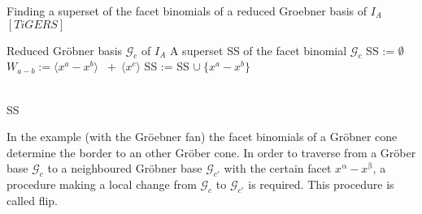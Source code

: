 \begin{algorithm}
\caption{Finding a superset of the facet binomials
of a reduced Groebner basis of $I_A$ $\left[ TiGERS\right]  $}
\label{alg:facetSS}
\begin{algorithmic}[1]

\Require
Reduced Gröbner basis $ \mathcal{G}_{c} $ of $I_A$
\Ensure A superset SS of the facet binomial $\mathcal{G}_{c}$
\State SS := $\emptyset$
\State $W_{a - b} := \langle x^{a}-x^{b}\rangle$
$~+~ \langle x^{c} \rangle$ 
\State SS := SS $\cup~ \{x^{a}-x^{b} \}$

\EndIf
\EndFor \\
\Return SS

\end{algorithmic}
\end{algorithm}
 





 



In the example (with the Gröebner fan) the facet binomials of a Gröbner cone determine the border to an other Gröber cone.
In order to traverse from a Gröber base $\mathcal{G}_c$ to a neighboured Gröbner base $\mathcal{G}_{c'}$ with the certain facet $x^{\upalpha}-x^{\upbeta} $, a procedure making a local change from $\mathcal{G}_c$ to $\mathcal{G}_{c'}$ is required.
This procedure is called flip.

\newpage



